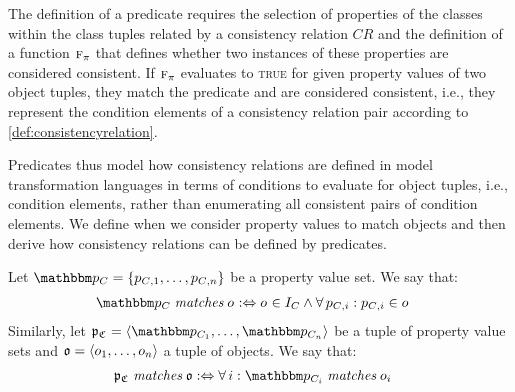 The definition of a predicate requires the selection of properties of the classes within the class tuples related by a consistency relation $CR$ and the definition of a function $\textsc{f}_\pi$ that defines whether two instances of these properties are considered consistent.
If $\textsc{f}_\pi$ evaluates to \textsc{true} for given property values of two object tuples, they match the predicate and are considered consistent, i.e., they represent the condition elements of a consistency relation pair according to \autoref{def:consistencyrelation}.

Predicates thus model how consistency relations are defined in model transformation languages in terms of conditions to evaluate for object tuples, i.e., condition elements, rather than enumerating all consistent pairs of condition elements.
We define when we consider property values to match objects and then derive how consistency relations can be defined by predicates.


\begin{definition}
Let $\propertyvalueset{p}{\class{C}{}} = \setted{p_{\class{C}{}, 1}, \dots, p_{\class{C}{}, n}}$ be a property value set. We say that:
\begin{align*}
    &
    \propertyvalueset{p}{\class{C}{}} \matchesmath \object{o}{} \equivalentperdefinition
    \object{o}{} \in I_{\class{C}{}} \land \forall p_{\class{C}{}, i} : p_{\class{C}{}, i} \in \object{o}{}
\end{align*}
%
Similarly, let $\propertyvaluesettuple{p}{\classtuple{C}{}} = \tupled{\propertyvalueset{p}{\class{C}{1}}, \dots, \propertyvalueset{p}{\class{C}{n}}}$ be a tuple of property value sets and $\tuple{o} = \tupled{\object{o}{1}, \dots, \object{o}{n}}$ a tuple of objects. We say that:
\begin{align*}
    &
    \propertyvaluesettuple{p}{\classtuple{C}{}} \matchesmath \tuple{o} \equivalentperdefinition
    \forall i : \propertyvalueset{p}{\class{C}{i}} \matchesmath \object{o}{i}
\end{align*}
\end{definition}

